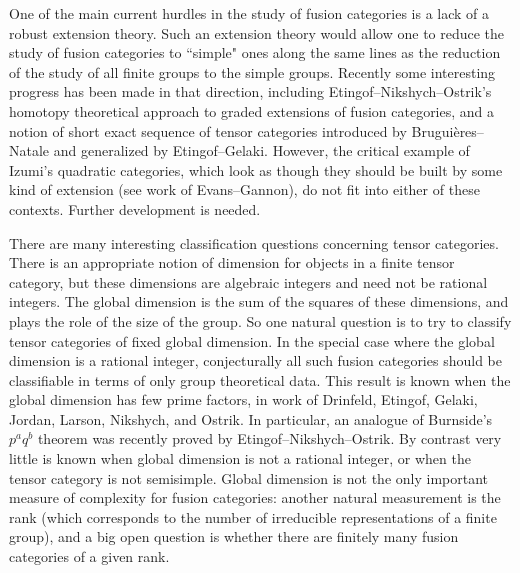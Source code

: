 \documentclass[12pt]{article}
\begin{document}
One of the main current hurdles in the study of fusion categories is a lack of a robust extension theory. Such an extension theory would allow one to reduce the study of fusion categories to ``simple" ones along the same lines as the reduction of the study of all finite groups to the simple groups. Recently some interesting progress has been made in that direction, including Etingof--Nikshych--Ostrik's homotopy theoretical approach to graded extensions of fusion categories, and a notion of short exact sequence of tensor categories introduced by Brugui\`eres--Natale and generalized by Etingof--Gelaki. However, the critical example of Izumi's quadratic categories, which look as though they should be built by some kind of extension (see work of Evans--Gannon), do not fit into either of these contexts. Further development is needed.

There are many interesting classification questions concerning tensor categories. There is an appropriate notion of dimension for objects in a finite tensor category, but these dimensions are algebraic integers and need not be rational integers. The global dimension is the sum of the squares of these dimensions, and plays the role of the size of the group. So one natural question is to try to classify tensor categories of fixed global dimension. In the special case where the global dimension is a rational integer, conjecturally all such fusion categories should be classifiable in terms of only group theoretical data.  This result is known when the global dimension has few prime factors, in work of Drinfeld, Etingof, Gelaki, Jordan, Larson, Nikshych, and Ostrik. In particular, an analogue of Burnside's $p^a q^b$ theorem was recently proved by Etingof--Nikshych--Ostrik. By contrast very little is known when global dimension is not a rational integer, or when the tensor category is not semisimple. Global dimension is not the only important measure of complexity for fusion categories: another natural measurement is the rank (which corresponds to the number of irreducible representations of a finite group), and a big open question is whether there are finitely many fusion categories of a given rank.
\end{document}
